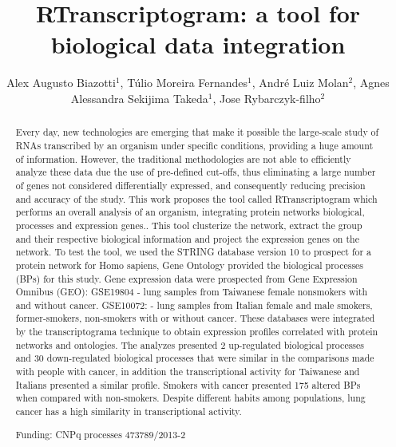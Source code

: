 \documentclass[twoside]{article}
\title{\vspace{-15mm}\fontsize{24pt}{10pt}\selectfont\textbf{RTranscriptogram: a tool for biological data integration}} %
\author{Alex Augusto Biazotti$^1$, T\'ulio Moreira Fernandes$^1$, Andr\'e Luiz Molan$^2$, Agnes Alessandra Sekijima Takeda$^1$, Jose Rybarczyk-filho$^2$}
\affil{1 INSTITUTO DE BIOCI\^ENCIAS DE BOTUCATU - UNESP\\ 2 UNESP\\ }
\date{}
\begin{document}
\maketitle %

\thispagestyle{fancy} %


\begin{abstract}
Every day, new technologies are emerging that make it possible the large-scale study of RNAs transcribed by an organism under specific conditions, providing a huge amount of information. However, the traditional methodologies are not able to efficiently analyze these data due the use of pre-defined cut-offs, thus eliminating a large number of genes not considered differentially expressed, and consequently reducing precision and accuracy of the study. This work proposes the tool called RTranscriptogram which performs an overall analysis of an organism, integrating protein networks biological,  processes and expression genes.. This tool clusterize the network, extract the group and their respective biological information and project the expression genes on the network.  To test the tool, we used the STRING database version 10 to prospect for a protein network for Homo sapiens, Gene Ontology provided the biological processes (BPs) for this study. Gene expression data were prospected from Gene Expression Omnibus (GEO): GSE19804 - lung samples from Taiwanese female nonsmokers with and without cancer. GSE10072: - lung samples from Italian female and male smokers, former-smokers, non-smokers with or without cancer. These databases were integrated by the transcriptograma technique to obtain expression profiles correlated with protein networks and ontologies. The analyzes presented 2 up-regulated biological processes and 30 down-regulated biological processes that were similar in the comparisons made with people with cancer, in addition the transcriptional activity for Taiwanese and Italians presented a similar profile. Smokers with cancer presented 175 altered BPs when compared with non-smokers. Despite different habits among populations, lung cancer has a high similarity in transcriptional activity.

Funding: CNPq processes 473789/2013-2
\end{abstract}
\end{document}
